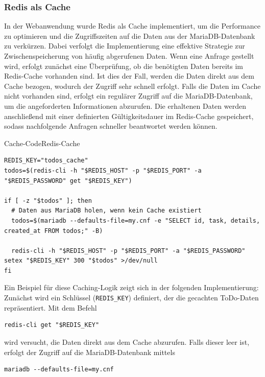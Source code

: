 \subsubsection{Redis als Cache}
In der Webanwendung wurde Redis als Cache implementiert, um die Performance zu optimieren und die Zugriffszeiten auf die Daten aus der MariaDB-Datenbank zu verkürzen. Dabei verfolgt die Implementierung eine effektive Strategie zur Zwischenspeicherung von häufig abgerufenen Daten. Wenn eine Anfrage gestellt wird, erfolgt zunächst eine Überprüfung, ob die benötigten Daten bereits im Redis-Cache vorhanden sind. Ist dies der Fall, werden die Daten direkt aus dem Cache bezogen, wodurch der Zugriff sehr schnell erfolgt. Falls die Daten im Cache nicht vorhanden sind, erfolgt ein regulärer Zugriff auf die MariaDB-Datenbank, um die angeforderten Informationen abzurufen. Die erhaltenen Daten werden anschließend mit einer definierten Gültigkeitsdauer im Redis-Cache gespeichert, sodass nachfolgende Anfragen schneller beantwortet werden können.

\begin{code}{Cache-Code}{Redis-Cache}
        \begin{verbatim}
REDIS_KEY="todos_cache"
todos=$(redis-cli -h "$REDIS_HOST" -p "$REDIS_PORT" -a "$REDIS_PASSWORD" get "$REDIS_KEY")

if [ -z "$todos" ]; then
  # Daten aus MariaDB holen, wenn kein Cache existiert
  todos=$(mariadb --defaults-file=my.cnf -e "SELECT id, task, details, created_at FROM todos;" -B)

  redis-cli -h "$REDIS_HOST" -p "$REDIS_PORT" -a "$REDIS_PASSWORD" setex "$REDIS_KEY" 300 "$todos" >/dev/null
fi
        \end{verbatim}
\end{code}

Ein Beispiel für diese Caching-Logik zeigt sich in der folgenden Implementierung: 
Zunächst wird ein Schlüssel (\texttt{REDIS\_KEY}) definiert, der die gecachten ToDo-Daten repräsentiert. 
Mit dem Befehl 

\begin{verbatim}
redis-cli get "$REDIS_KEY"
\end{verbatim}

wird versucht, die Daten direkt aus dem Cache abzurufen. Falls dieser leer ist, erfolgt der Zugriff auf die MariaDB-Datenbank mittels

\begin{verbatim}
mariadb --defaults-file=my.cnf
\end{verbatim}

